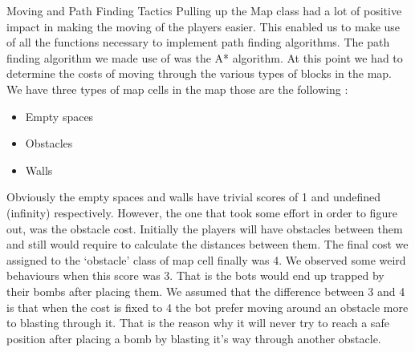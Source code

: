 Moving and Path Finding Tactics
Pulling up the Map class had a lot of positive impact in making the moving of the players easier. This enabled us to make use of all the functions necessary to implement path finding algorithms. The path finding algorithm we made use of was the A* algorithm. At this point we had to determine the costs of moving through the various types of blocks in the map. We have three types of map cells in the map those are the following :
\begin{itemize}
\item Empty spaces
\item Obstacles
\item Walls
\end{itemize}

Obviously the empty spaces and walls have trivial scores of 1 and undefined (infinity) respectively. However, the one that took some effort in order to figure out, was the obstacle cost.
Initially the players will have obstacles between them and still would require to calculate the distances between them. The final cost we assigned to the ‘obstacle’ class of map cell finally was 4. We observed some weird behaviours when this score was 3. That is the bots would end up trapped by their bombs after placing them. We assumed that the difference between 3 and 4 is that when the cost is fixed to 4 the bot prefer moving around an obstacle more to blasting through it. That is the reason why it will never try to reach a safe position after placing a bomb by blasting it’s way through another obstacle.
